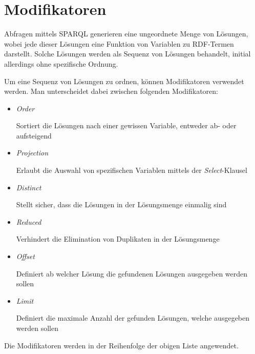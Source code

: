 \section{Modifikatoren}
\label{sec:sparql_modifikatoren}

Abfragen mittels SPARQL generieren eine ungeordnete Menge von Lösungen, wobei jede dieser Lösungen eine Funktion von Variablen zu RDF-Termen darstellt. Solche Lösungen werden als Sequenz von Lösungen behandelt, initial allerdings ohne spezifische Ordnung.~\cite[15 Solution Sequences and Modifiers]{w3sparql_querylang}

Um eine Sequenz von Lösungen zu ordnen, können Modifikatoren verwendet werden. Man unterscheidet dabei zwischen folgenden Modifikatoren:

\begin{itemize}
\item \textit{Order}

Sortiert die Lösungen nach einer gewissen Variable, entweder ab- oder aufsteigend

\item \textit{Projection}

Erlaubt die Auswahl von spezifischen Variablen mittels der \textit{Select}-Klausel

\item \textit{Distinct}

Stellt sicher, dass die Lösungen in der Lösungsmenge einmalig sind

\item \textit{Reduced}

Verhindert die Elimination von Duplikaten in der Lösungsmenge

\item \textit{Offset}

Definiert ab welcher Lösung die gefundenen Lösungen ausgegeben werden sollen

\item \textit{Limit}

Definiert die maximale Anzahl der gefunden Lösungen, welche ausgegeben werden sollen

\end{itemize}

Die Modifikatoren werden in der Reihenfolge der obigen Liste angewendet.~\cite[vgl. 15 Solution Sequences and Modifiers]{w3sparql_querylang}


